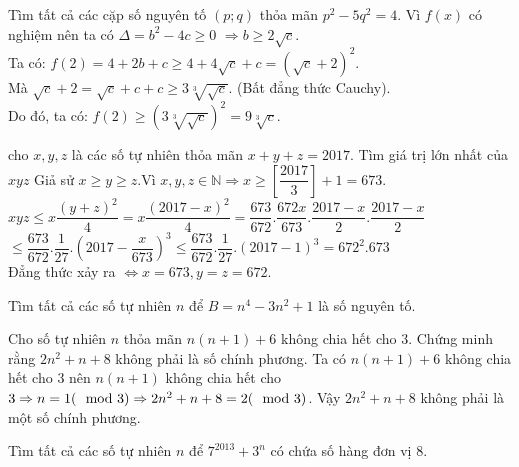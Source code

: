\begin{bt}%
	Tìm tất cả các cặp số nguyên tố $(p;q)$ thỏa mãn $p^2-5q^2=4$.
	\loigiai
	{
		Vì $f(x)$ có nghiệm nên ta có $\Delta = b^2-4c \geq 0$ $\Rightarrow b \geq 2\sqrt{c}$.\\
		Ta có: $f(2)=4+2b+c \geq 4+4\sqrt{c}+c=\left(\sqrt{c}+2\right)^2$.\\
		Mà $\sqrt{c}+2=\sqrt{c}+c+c \geq 3\sqrt[3]{\sqrt{c}}$. (Bất đẳng thức Cauchy).\\
		Do đó, ta có: $f(2) \geq \left(3\sqrt[3]{\sqrt{c}}\right)^2=9\sqrt[3]{c}$.
	}
\end{bt}
\begin{bt}%
	cho $x,y,z$ là các số tự nhiên thỏa mãn $x+y+z=2017$. Tìm giá trị lớn nhất của $xyz$
	\loigiai
	{Giả sử $x\geq y\geq z$.Vì $x,y,z\in \mathbb{N}\Rightarrow x\geq \left [ \dfrac{2017}{3} \right ]+1=673$.\\
		$xyz\leq x\dfrac{(y+z)^{2}}{4}= x\dfrac{(2017-x)^{2}}{4}= \dfrac{673}{672}.\dfrac{672x}{673}.\dfrac{2017-x}{2}.\dfrac{2017-x}{2}$\\
		$\leq \dfrac{673}{672}.\dfrac{1}{27}.(2017-\dfrac{x}{673})^{3}\leq \dfrac{673}{672}.\dfrac{1}{27}.(2017-1)^{3}=672^{2}.673$\\
		Đẳng thức xảy ra $\Leftrightarrow x=673,y=z=672$.
	}
\end{bt}
\begin{bt}%
	Tìm tất cả các số tự nhiên $n$ để $B = n^4 - 3n^2 + 1$ là số nguyên tố.
\end{bt}
\begin{bt}%
	Cho số tự nhiên $n$ thỏa mãn $n(n+1)+6$ không chia hết cho $3$. Chứng minh rằng $2n^{2} +n+8$ không phải là số chính phương.
	\loigiai
	{
		Ta có $n(n+1)+6$ không chia hết cho $3$ nên $n(n+1)$ không chia hết cho $3 \Rightarrow n=1(\mod 3)\Rightarrow\\
		2n^{2}+n+8=2(\mod 3)$.
		Vậy $2n^{2}+n+8$ không phải là một số chính phương.
	}
\end{bt}
\begin{bt}%
	Tìm tất cả các số tự nhiên $n$ để $7^{2013} + 3^n$ có chứa số hàng đơn vị $8$.
\end{bt}

